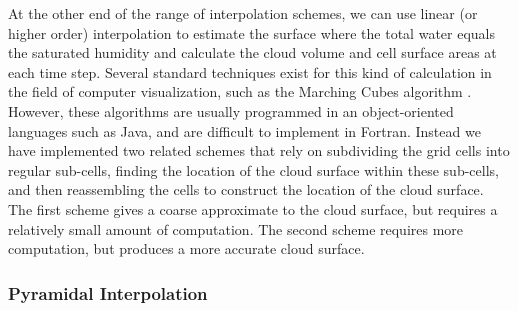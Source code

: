 \documentclass[12pt]{article}
\begin{document}
At the other end of the range of interpolation schemes, we can use linear (or 
higher order) interpolation to estimate the surface where the total water 
equals the saturated humidity and calculate the cloud volume and cell surface 
areas at each time step.  Several standard techniques exist for this kind of 
calculation in the field of computer visualization, such as the Marching 
Cubes algorithm \citep{Lorensen1987}.  However, these algorithms are usually 
programmed in an object-oriented languages such as Java, and are difficult to 
implement in Fortran.  Instead we have implemented two related schemes that 
rely on subdividing the grid cells into regular sub-cells, finding the location 
of the cloud surface within these sub-cells, and then reassembling the cells to 
construct the location of the cloud surface.  The first scheme gives a coarse 
approximate to the cloud surface, but requires a relatively small amount of 
computation.  The second scheme requires more computation, but produces a more 
accurate cloud surface.


\subsubsection{Pyramidal Interpolation}
\end{document}
